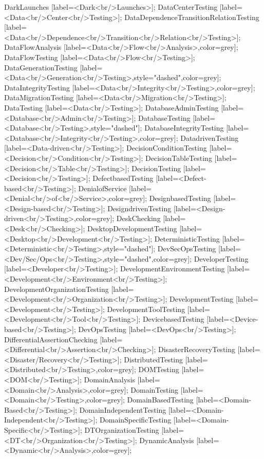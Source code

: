 \documentclass{article}
\begin{document}
{DarkLaunches [label=<Dark<br/>Launches>];
DataCenterTesting [label=<Data<br/>Center<br/>Testing>];
DataDependenceTransitionRelationTesting [label=<Data<br/>Dependence<br/>Transition<br/>Relation<br/>Testing>];
DataFlowAnalysis [label=<Data<br/>Flow<br/>Analysis>,color=grey];
DataFlowTesting [label=<Data<br/>Flow<br/>Testing>];
DataGenerationTesting [label=<Data<br/>Generation<br/>Testing>,style="dashed",color=grey];
DataIntegrityTesting [label=<Data<br/>Integrity<br/>Testing>,color=grey];
DataMigrationTesting [label=<Data<br/>Migration<br/>Testing>];
DataTesting [label=<Data<br/>Testing>];
DatabaseAdminTesting [label=<Database<br/>Admin<br/>Testing>];
DatabaseTesting [label=<Database<br/>Testing>,style="dashed"];
DatabaseIntegrityTesting [label=<Database<br/>Integrity<br/>Testing>,color=grey];
DatadrivenTesting [label=<Data-driven<br/>Testing>];
DecisionConditionTesting [label=<Decision<br/>Condition<br/>Testing>];
DecisionTableTesting [label=<Decision<br/>Table<br/>Testing>];
DecisionTesting [label=<Decision<br/>Testing>];
DefectbasedTesting [label=<Defect-based<br/>Testing>];
DenialofService [label=<Denial<br/>of<br/>Service>,color=grey];
DesignbasedTesting [label=<Design-based<br/>Testing>];
DesigndrivenTesting [label=<Design-driven<br/>Testing>,color=grey];
DeskChecking [label=<Desk<br/>Checking>];
DesktopDevelopmentTesting [label=<Desktop<br/>Development<br/>Testing>];
DeterministicTesting [label=<Deterministic<br/>Testing>,style="dashed"];
DevSecOpsTesting [label=<Dev/Sec/Ops<br/>Testing>,style="dashed",color=grey];
DeveloperTesting [label=<Developer<br/>Testing>];
DevelopmentEnvironmentTesting [label=<Development<br/>Environment<br/>Testing>];
DevelopmentOrganizationTesting [label=<Development<br/>Organization<br/>Testing>];
DevelopmentTesting [label=<Development<br/>Testing>];
DevelopmentToolTesting [label=<Development<br/>Tool<br/>Testing>];
DevicebasedTesting [label=<Device-based<br/>Testing>];
DevOpsTesting [label=<DevOps<br/>Testing>];
DifferentialAssertionChecking [label=<Differential<br/>Assertion<br/>Checking>];
DisasterRecoveryTesting [label=<Disaster/Recovery<br/>Testing>];
DistributedTesting [label=<Distributed<br/>Testing>,color=grey];
DOMTesting [label=<DOM<br/>Testing>];
DomainAnalysis [label=<Domain<br/>Analysis>,color=grey];
DomainTesting [label=<Domain<br/>Testing>,color=grey];
DomainBasedTesting [label=<Domain-Based<br/>Testing>];
DomainIndependentTesting [label=<Domain-Independent<br/>Testing>];
DomainSpecificTesting [label=<Domain-Specific<br/>Testing>];
DTOrganizationTesting [label=<DT<br/>Organization<br/>Testing>];
DynamicAnalysis [label=<Dynamic<br/>Analysis>,color=grey];
}
\end{document}
